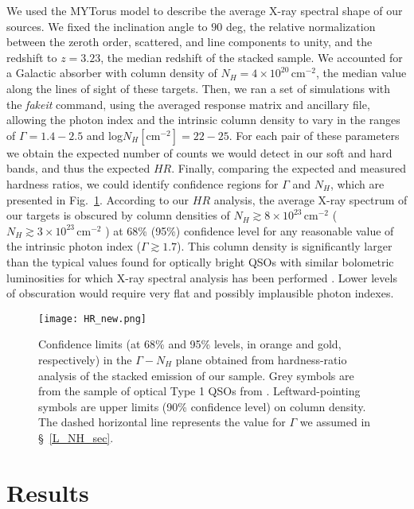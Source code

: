 \documentclass[useAMS,usenatbib]{mnras}
\newcommand*{\nhunits}{\mathrm{cm^{-2}}}
\begin{document}
We used the MYTorus model to describe the average X-ray spectral shape of our sources. We fixed the inclination angle to $90$ deg, the relative normalization between the zeroth order, scattered, and line components to unity, and the redshift to $z=3.23$, the median redshift of the stacked sample. We accounted for a Galactic absorber with column density of \mbox{$N_H=4\times10^{20}\,\nhunits$}, the median value along the lines of sight of these targets. 
Then, we ran a set of simulations with the \textit{fakeit} command, using the averaged response matrix and ancillary file, allowing the photon index and the intrinsic column density to vary in the ranges of $\Gamma=1.4-2.5$ and log$N_H[\nhunits]=22-25$. For each pair of these parameters we obtain the expected number of counts we would detect in our soft and hard bands, and thus the expected $HR$. Finally, comparing the expected and measured hardness ratios, we could identify confidence regions for $\Gamma$ and $N_H$, which are presented in Fig.~\ref{HR}. 
According to our $HR$ analysis, the average X-ray spectrum of our targets is obscured by column densities of $N_H\gtrsim8\times10^{23}\,\nhunits$ ($N_H\gtrsim3\times10^{23}\,\nhunits$ ) at 68\% (95\%) confidence level for any reasonable value of the intrinsic photon index ($\Gamma\gtrsim1.7$). 
This column density is significantly larger than the typical values found for optically bright QSOs with similar bolometric luminosities for which X-ray spectral analysis has been performed \citep[e.g.][]{Martocchia17}. Lower levels of obscuration would require very flat and possibly implausible photon indexes.
	
	





\begin{figure} 
	\centering
	\texttt{[image: HR\_new.png]}
	\caption{Confidence limits (at 68\% and 95\% levels, in orange and gold, respectively) in the $\Gamma-N_H$ plane obtained from hardness-ratio analysis of the stacked emission of our sample. Grey symbols are from the sample of optical Type 1 QSOs from \citet{Martocchia17}. Leftward-pointing symbols are upper limits (90\% confidence level) on column density. The dashed horizontal line represents the value for $\Gamma$ we assumed in \S~\ref{L_NH_sec}. }
	\label{HR}
\end{figure}



\section{Results}
\end{document}
